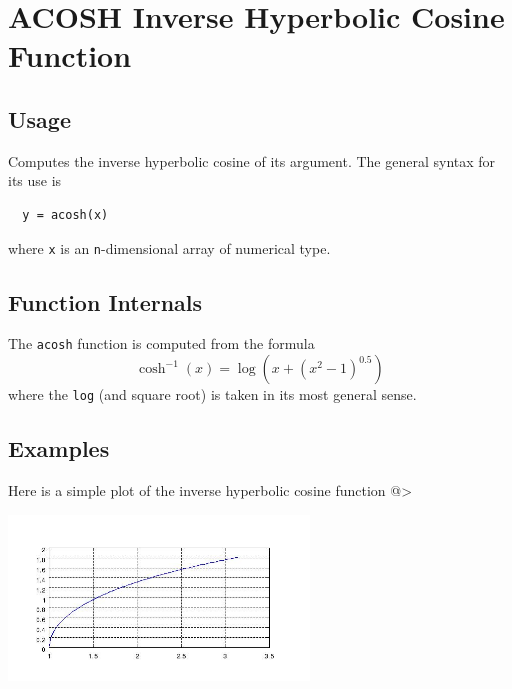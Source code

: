 \section{ACOSH Inverse Hyperbolic Cosine Function}

\subsection{Usage}

Computes the inverse hyperbolic cosine of its argument.  The general
syntax for its use is
\begin{verbatim}
  y = acosh(x)
\end{verbatim}
where \verb|x| is an \verb|n|-dimensional array of numerical type.
\subsection{Function Internals}

The \verb|acosh| function is computed from the formula
\[
   \cosh^{-1}(x) = \log\left(x + (x^2 - 1)^0.5\right)
\]
where the \verb|log| (and square root) is taken in its most general sense.
\subsection{Examples}

Here is a simple plot of the inverse hyperbolic cosine function
@>


\centerline{\includegraphics[width=8cm]{acoshplot}}

